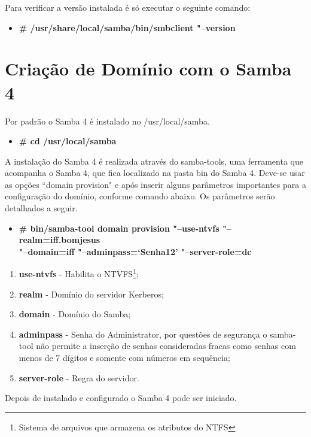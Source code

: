 Para verificar a versão instalada é só executar o seguinte comando:

\begin{itemize}
	\item \textbf{\# /usr/share/local/samba/bin/smbclient "--version}
\end{itemize}

\section{Criação de Domínio com o Samba 4}

Por padrão o Samba 4 é instalado no /usr/local/samba.

\begin{itemize}
	\item \textbf{\# cd /usr/local/samba}
\end{itemize}

A instalação do Samba 4 é realizada através do samba-tools, uma ferramenta que acompanha o Samba 4, que fica localizado na pasta bin do Samba 4. Deve-se usar as opções ``domain provision" e após inserir alguns parâmetros importantes para a configuração do domínio, conforme comando abaixo. Os parâmetros serão detalhados a seguir.

\begin{itemize}
	\item \textbf{\# bin/samba-tool domain provision "--use-ntvfs "--realm=iff.bomjesus  \\"--domain=iff  "--adminpass=`Senha12' "--server-role=dc}
\end{itemize}

\begin{enumerate}
	\item \textbf{use-ntvfs} - Habilita o NTVFS\footnote[3]{Sistema de arquivos que armazena os atributos do NTFS};
	\item \textbf{realm} - Domínio do servidor Kerberos;
	\item \textbf{domain} - Domínio do Samba;
	\item \textbf{adminpass} - Senha do Administrator, por questões de segurança o samba-tool não permite a inserção de senhas consideradas fracas como senhas com menos de 7 dígitos e somente com números em sequência;
	\item \textbf{server-role} - Regra do servidor.
\end{enumerate}

Depois de instalado e configurado o Samba 4 pode ser iniciado.

